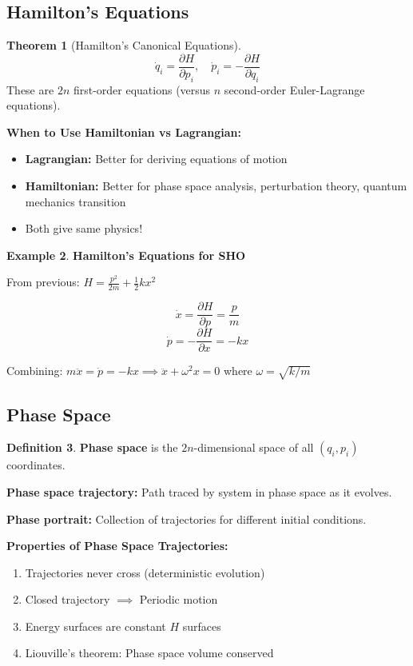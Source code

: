 \documentclass[12pt,a4paper]{article}
\theoremstyle{definition}
\newtheorem{theorem}{Theorem}[section]
\newtheorem{definition}[theorem]{Definition}
\newtheorem{example}[theorem]{Example}
\begin{document}
\subsection{Hamilton's Equations}

\begin{theorem}[Hamilton's Canonical Equations]
\[
\dot{q}_i = \frac{\partial H}{\partial p_i}, \quad \dot{p}_i = -\frac{\partial H}{\partial q_i}
\]
These are $2n$ first-order equations (versus $n$ second-order Euler-Lagrange equations).
\end{theorem}

\begin{tipbox}
\textbf{When to Use Hamiltonian vs Lagrangian:}
\begin{itemize}
    \item \textbf{Lagrangian:} Better for deriving equations of motion
    \item \textbf{Hamiltonian:} Better for phase space analysis, perturbation theory, quantum mechanics transition
    \item Both give same physics!
\end{itemize}
\end{tipbox}

\begin{example}
\textbf{Hamilton's Equations for SHO}

From previous: $H = \frac{p^2}{2m} + \frac{1}{2}kx^2$

\[
\dot{x} = \frac{\partial H}{\partial p} = \frac{p}{m}
\]
\[
\dot{p} = -\frac{\partial H}{\partial x} = -kx
\]

Combining: $m\ddot{x} = \dot{p} = -kx \implies \ddot{x} + \omega^2 x = 0$ where $\omega = \sqrt{k/m}$
\end{example}

\subsection{Phase Space}

\begin{definition}
\textbf{Phase space} is the $2n$-dimensional space of all $(q_i, p_i)$ coordinates.

\textbf{Phase space trajectory:} Path traced by system in phase space as it evolves.

\textbf{Phase portrait:} Collection of trajectories for different initial conditions.
\end{definition}

\begin{importantbox}
\textbf{Properties of Phase Space Trajectories:}
\begin{enumerate}
    \item Trajectories never cross (deterministic evolution)
    \item Closed trajectory $\implies$ Periodic motion
    \item Energy surfaces are constant $H$ surfaces
    \item Liouville's theorem: Phase space volume conserved
\end{enumerate}
\end{importantbox}
\end{document}
